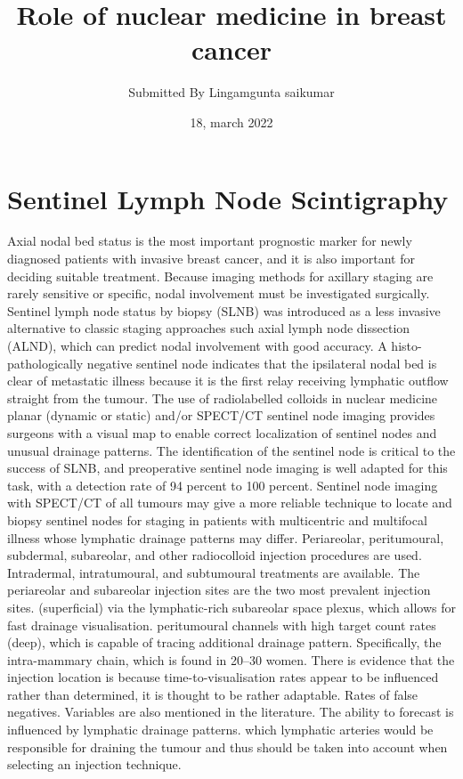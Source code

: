 \documentclass{article}
\title{Role of nuclear medicine in breast cancer}
\author{Submitted By Lingamgunta saikumar}
\date{18, march 2022}
\begin{document}
\maketitle

\section{Sentinel Lymph Node Scintigraphy}

Axial nodal bed status is the most important prognostic marker for newly diagnosed patients with 
invasive breast cancer, and it is also important for deciding suitable treatment. Because imaging 
methods for axillary staging are rarely sensitive or specific, nodal involvement must be investigated 
surgically. Sentinel lymph node status by biopsy (SLNB) was introduced as a less invasive alternative 
to classic staging approaches such axial lymph node dissection (ALND), which can predict nodal 
involvement with good accuracy. A histo-pathologically negative sentinel node indicates that the 
ipsilateral nodal bed is clear of metastatic illness because it is the first relay receiving lymphatic 
outflow straight from the tumour.
The use of radiolabelled colloids in nuclear medicine planar (dynamic or static) and/or SPECT/CT 
sentinel node imaging provides surgeons with a visual map to enable correct localization of sentinel 
nodes and unusual drainage patterns. The identification of the sentinel node is critical to the success 
of SLNB, and preoperative sentinel node imaging is well adapted for this task, with a detection rate 
of 94 percent to 100 percent. Sentinel node imaging with SPECT/CT of all tumours may give a more 
reliable technique to locate and biopsy sentinel nodes for staging in patients with multicentric and 
multifocal illness whose lymphatic drainage patterns may differ.
Periareolar, peritumoural, subdermal, subareolar, and other radiocolloid injection procedures are 
used. Intradermal, intratumoural, and subtumoural treatments are available. The periareolar and 
subareolar injection sites are the two most prevalent injection sites.
(superficial) via the lymphatic-rich subareolar space plexus, which allows for fast drainage 
visualisation. peritumoural channels with high target count rates (deep), which is capable of tracing 
additional drainage pattern. Specifically, the intra-mammary chain, which is found in 20–30%
women. There is evidence that the injection location is because time-to-visualisation rates appear to 
be influenced rather than determined, it is thought to be rather adaptable. Rates of false negatives. 
Variables are also mentioned in the literature. The ability to forecast is influenced by lymphatic 
drainage patterns. which lymphatic arteries would be responsible for draining the tumour and thus 
should be taken into account when selecting an injection technique.
\end{document}
